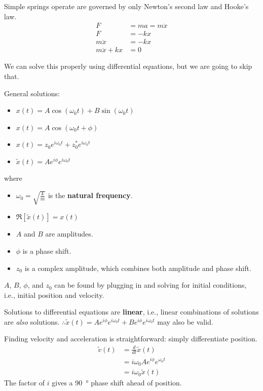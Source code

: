 \documentclass[a4paper, titlepage]{book}
\begin{document}
Simple springs operate are governed by only Newton's second law and Hooke's law.
\begin{equation}
    \begin{aligned}
        F              &= ma = m\ddot{x} \\
        F              &= -kx \\
        m\ddot{x}      &= -kx \\
        m\ddot{x} + kx &= 0
    \end{aligned}
\end{equation}

We can solve this properly using differential equations,
but we are going to skip that.

General solutions:
\begin{itemize}
    \item \(x(t) = A\cos\left(\omega_0 t\right) + B\sin\left(\omega_0 t\right)\)
    \item \(x(t) = A\cos\left(\omega_0 t + \phi\right)\)
    \item \(x(t) = z_0 e^{i \omega_0 t} + z^*_0 e^{i \omega_0 t}\)
    \item \(\tilde{x}(t) = A e^{i \phi} e^{i \omega_0 t}\)
\end{itemize}
where 
\begin{itemize}
    \item \(\omega_0 = \sqrt{\frac{k}{m}}\) is the \textbf{natural frequency}.
    \item \(\Re[\tilde{x}(t)] = x(t)\)
    \item \(A\) and \(B\) are amplitudes.
    \item \(\phi\) is a phase shift.
    \item \(z_0\) is a complex amplitude, which combines both amplitude and phase shift.
\end{itemize}
\(A\), \(B\), \(\phi\), and \(z_0\)
can be found by plugging in and solving for initial conditions,
i.e., initial position and velocity.

Solutions to differential equations are \textbf{linear},
i.e., linear combinations of solutions are \emph{also} solutions.
\(\therefore \tilde{x}(t) = A e^{i \phi} e^{i \omega_0 t} + B e^{i \phi} e^{i \omega_0 t}\)
may also be valid.

Finding velocity and acceleration is straightforward: simply differentiate position.
\begin{equation}
    \begin{aligned}
        \tilde{v}(t) &= \frac{d}{dt} \tilde{x}(t) \\
        &= i\omega_0 A e^{i\phi} e^{\omega_0 t} \\
        &= i\omega_0 \tilde{x}(t)
    \end{aligned}
\end{equation}
The factor of \(i\) gives a \qty{90}{\degree} phase shift ahead of position.
\end{document}
